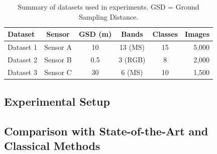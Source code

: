 \documentclass[journal,onecolumn,draftcls]{IEEEtran}
\begin{document}

\begin{table}[t]
  \centering
  \caption{Summary of datasets used in experiments. GSD = Ground Sampling Distance.}
  \label{tab:datasets}
  \begin{tabular}{lccccr}
    \toprule
    \textbf{Dataset} & \textbf{Sensor} & \textbf{GSD (m)} & \textbf{Bands} &
    \textbf{Classes} & \textbf{Images} \\
    \midrule
    Dataset 1 & Sensor A & 10 & 13 (MS) & 15 & 5,000 \\
    Dataset 2 & Sensor B & 0.5 & 3 (RGB) & 8  & 2,000 \\
    Dataset 3 & Sensor C & 30 & 6 (MS) & 10 & 1,500 \\
    \bottomrule
  \end{tabular}
\end{table}


\subsection{Experimental Setup}
\label{sec:exp-setup}


\subsection{Comparison with State-of-the-Art and Classical Methods}
\label{sec:exp-main}

\end{document}
